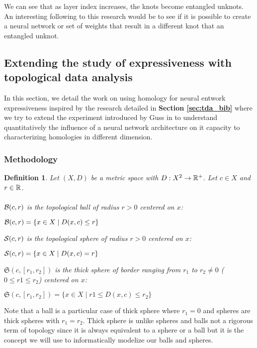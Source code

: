 \documentclass[12pt, a4paper]{article}
\newtheorem{definition}{Definition}
\begin{document}
We can see that as layer index increases, the knots become entangled unknots. An interesting following to this research would be to see if it is possible to create a neural network or set of weights that result in a different knot that an entangled unknot. 

\subsection{Extending the study of expressiveness with topological data analysis} 

In this section, we detail the work on using homology for neural entwork expressiveness inspired by the research detailed in \textbf{Section \ref{sec:tda_bib}} where we try to extend the experiment introduced by Guss in \cite{guss_characterizing_2018} to understand quantitatively the influence of a neural network architecture on it capacity to characterizing homologies in different dimension. 

\subsubsection{Methodology}

\begin{definition}
  Let $(X, D)$ be a metric space with $D : X^2 \to \R^+$. Let $c \in X$ and $r \in \R$.\\
  \\
  $\B(c,r)$ is the topological ball of radius $r > 0 $ centered on $x$:
  \begin{center}
    $\B(c,r) = \{ x \in X \mid D(x,c) \le r \}$ 
  \end{center}
  $\S(c,r)$ is the topological sphere of radius $r > 0$ centered on $x$:
  \begin{center}
    $\S(c,r) = \{ x \in X \mid D(x,c) = r \}$ 
  \end{center}
  $\mathfrak{S}(c,[r_1,r_2])$ is the thick sphere of border ranging from $r_1$ to $r_2 \ne 0$ ($0 \le r1 \le r_2$) centered on $x$:
  \begin{center}
    $\mathfrak{S}(c,[r_1, r_2]) = \{ x \in X \mid r1 \le D(x,c) \le r_2 \}$ 
  \end{center}
  \label{def:ball_sphere}
\end{definition}

Note that a ball is a particular case of thick sphere where $r_1 = 0$ and spheres are thick spheres with $r_1 = r_2$. Thick sphere is unlike spheres and balls not a rigorous term of topology since it is always equivalent to a sphere or a ball but it is the concept we will use to informatically modelize our balls and spheres.\\
\end{document}
